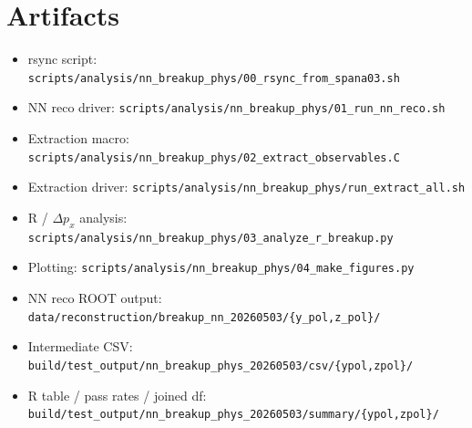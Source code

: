 \documentclass[a4paper,11pt]{article}
\begin{document}
\section*{Artifacts}
\begin{itemize}[nosep]
    \item rsync script: \texttt{scripts/analysis/nn\_breakup\_phys/00\_rsync\_from\_spana03.sh}
    \item NN reco driver: \texttt{scripts/analysis/nn\_breakup\_phys/01\_run\_nn\_reco.sh}
    \item Extraction macro: \texttt{scripts/analysis/nn\_breakup\_phys/02\_extract\_observables.C}
    \item Extraction driver: \texttt{scripts/analysis/nn\_breakup\_phys/run\_extract\_all.sh}
    \item R / $\Delta p_x$ analysis: \texttt{scripts/analysis/nn\_breakup\_phys/03\_analyze\_r\_breakup.py}
    \item Plotting: \texttt{scripts/analysis/nn\_breakup\_phys/04\_make\_figures.py}
    \item NN reco ROOT output: \texttt{data/reconstruction/breakup\_nn\_20260503/\{y\_pol,z\_pol\}/}
    \item Intermediate CSV: \texttt{build/test\_output/nn\_breakup\_phys\_20260503/csv/\{ypol,zpol\}/}
    \item R table / pass rates / joined df: \texttt{build/test\_output/nn\_breakup\_phys\_20260503/summary/\{ypol,zpol\}/}
\end{itemize}
\end{document}
